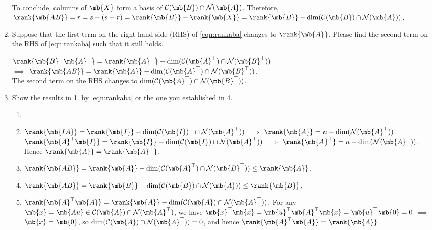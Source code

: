 \begin{exercise}
\begin{enumerate}
\begin{solution}
				\\
				To conclude, columns of $\mb{X}$ form a basis of $\mathcal{C}(\mb{B })\cap \mathcal{N}(\mb{A})$.
				Therefore, $\rank{\mb{AB }}=r=s-(s-r)=\rank{\mb{B }}-\rank{\mb{X }}=\rank{\mb{B }}-\dim(\mathcal{C}(\mb{B })\cap \mathcal{N}(\mb{A}))$.
				\qedhere
			\end{solution}

		\item Suppose that the first term on the right-hand side (RHS) of \eqref{eqn:rankaba} changes to $\rank{\mb{A}}$. Please find the second term on the RHS of \eqref{eqn:rankaba} such that it still holds.

			\begin{solution}
				$\rank{\mb{B}^\top\mb{A}^\top}=\rank{\mb{A}^\top}-\dim(\mathcal{C}(\mb{A}^\top)\cap \mathcal{N}(\mb{B}^\top))$ \\
				$\implies$ $\rank{\mb{AB}}=\rank{\mb{A}}-\dim(\mathcal{C}(\mb{A}^\top)\cap \mathcal{N}(\mb{B}^\top))$.\\
				The second term on the RHS changes to $\dim(\mathcal{C}(\mb{A}^\top)\cap \mathcal{N}(\mb{B}^\top))$.
				\qedhere
			\end{solution}

		\item Show the results in 1. by \eqref{eqn:rankaba} or the one you established in 4.

			\begin{solution}
				\begin{enumerate}
					\item []
					\item $\rank{\mb{IA}}=\rank{\mb{I}}-\dim(\mathcal{C}(\mb{I})^\top\cap \mathcal{N}(\mb{A}^\top))$ $\implies$ $\rank{\mb{A}}=n-\dim(\mathcal{N}(\mb{A}^\top))$.\\
						$\rank{\mb{A}^\top\mb{I}}=\rank{\mb{I}}-\dim(\mathcal{C}(\mb{I})\cap \mathcal{N}(\mb{A}^\top))$ $\implies$ $\rank{\mb{A}^\top}=n-\dim(\mathcal{N}(\mb{A}^\top))$.\\
						Hence $\rank{\mb{A}}=\rank{\mb{A}^\top}$.
					\item $\rank{\mb{AB}}=\rank{\mb{A}}-\dim(\mathcal{C}(\mb{A}^\top)\cap \mathcal{N}(\mb{B}^\top))\leq\rank{\mb{A}}$.
					\item $\rank{\mb{AB}}=\rank{\mb{B}}-\dim(\mathcal{C}(\mb{B})\cap \mathcal{N}(\mb{A}))\leq\rank{\mb{B}}$.
					\item $\rank{\mb{A}^\top\mb{A}}=\rank{\mb{A}}-\dim(\mathcal{C}(\mb{A})\cap \mathcal{N}(\mb{A}^\top))$.
						For any $\mb{x}=\mb{Au}\in \mathcal{C}(\mb{A})\cap \mathcal{N}(\mb{A}^\top)$, we have $\mb{x}^\top\mb{x}=\mb{u}^\top\mb{A}^\top\mb{x}=\mb{u}^\top\mb{0}=0$ $\implies$ $\mb{x}=\mb{0}$, so $\dim(\mathcal{C}(\mb{A})\cap \mathcal{N}(\mb{A}^\top)) = 0$, and hence $\rank{\mb{A}^\top\mb{A}}=\rank{\mb{A}}$.
						\qedhere
				\end{enumerate}
			\end{solution}

	\end{enumerate}
\end{exercise}


